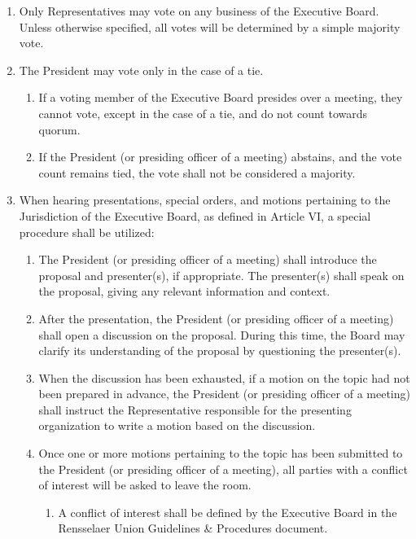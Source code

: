 
\begin{enumerate}
\item Only Representatives may vote on any business of the Executive Board. Unless otherwise specified, all votes will be determined by a simple majority vote.
\item The President may vote only in the case of a tie.
  \begin{enumerate}
  \item If a voting member of the Executive Board presides over a meeting, they cannot vote, except in the case of a tie, and do not count towards quorum.
  \item If the President (or presiding officer of a meeting) abstains, and the vote count remains tied, the vote shall not be considered a majority.
  \end{enumerate}
\item When hearing presentations, special orders, and motions pertaining to the Jurisdiction of the Executive Board, as defined in Article VI, a special procedure shall be utilized:
  \begin{enumerate}
  \item The President (or presiding officer of a meeting) shall introduce the proposal and presenter(s), if appropriate. The presenter(s) shall speak on the proposal, giving any relevant information and context.
  \item After the presentation, the President (or presiding officer of a meeting) shall open a discussion on the proposal. During this time, the Board may clarify its understanding of the proposal by questioning the presenter(s).
  \item When the discussion has been exhausted, if a motion on the topic had not been prepared in advance, the President (or presiding officer of a meeting) shall instruct the Representative responsible for the presenting organization to write a motion based on the discussion.
  \item Once one or more motions pertaining to the topic has been submitted to the President (or presiding officer of a meeting), all parties with a conflict of interest will be asked to leave the room.
    \begin{enumerate}
    \item A conflict of interest shall be defined by the Executive Board in the Rensselaer Union Guidelines \& Procedures document.
    \end{enumerate}

\end{enumerate}
\end{enumerate}
